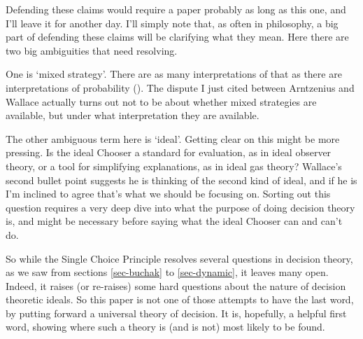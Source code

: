 \documentclass[
  10pt,
  letterpaper,
  DIV=11,
  numbers=noendperiod,
  twoside]{scrartcl}
\begin{document}
Defending these claims would require a paper probably as long as this
one, and I'll leave it for another day. I'll simply note that, as often
in philosophy, a big part of defending these claims will be clarifying
what they mean. Here there are two big ambiguities that need resolving.

One is `mixed strategy'. There are as many interpretations of that as
there are interpretations of probability
(). The dispute I
just cited between Arntzenius and Wallace actually turns out not to be
about whether mixed strategies are available, but under what
interpretation they are available.

The other ambiguous term here is `ideal'. Getting clear on this might be
more pressing. Is the ideal Chooser a standard for evaluation, as in
ideal observer theory, or a tool for simplifying explanations, as in
ideal gas theory? Wallace's second bullet point suggests he is thinking
of the second kind of ideal, and if he is I'm inclined to agree that's
what we should be focusing on. Sorting out this question requires a very
deep dive into what the purpose of doing decision theory is, and might
be necessary before saying what the ideal Chooser can and can't do.

So while the Single Choice Principle resolves several questions in
decision theory, as we saw from sections \ref{sec-buchak} to
\ref{sec-dynamic}, it leaves many open. Indeed, it raises (or re-raises)
some hard questions about the nature of decision theoretic ideals. So
this paper is not one of those attempts to have the last word, by
putting forward a universal theory of decision. It is, hopefully, a
helpful first word, showing where such a theory is (and is not) most
likely to be found.
\end{document}
